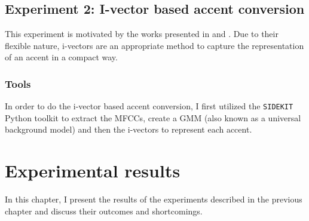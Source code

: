 \documentclass
[
    a4paper,
    twoside,
    12pt
]
{report}
\begin{document}
\hypertarget{experiment-2-i-vector-based-accent-conversion}{%
\section{Experiment 2: I-vector based accent
conversion}\label{experiment-2-i-vector-based-accent-conversion}}

This experiment is motivated by the works presented in \textcite{wu2016}
and \textcite{kinnunen2017}. Due to their flexible nature, i-vectors are
an appropriate method to capture the representation of an accent in a
compact way.

\hypertarget{tools-1}{%
\subsection{Tools}\label{tools-1}}

In order to do the i-vector based accent conversion, I first utilized
the \texttt{SIDEKIT} Python toolkit to extract the MFCCs, create a GMM
(also known as a universal background model) and then the i-vectors to
represent each accent.
\cleardoublepage
\chapter{Experimental results}

In this chapter, I present the results of the experiments described in
the previous chapter and discuss their outcomes and shortcomings.
\cleardoublepage
% 
% 

\printbibliography
\end{document}
